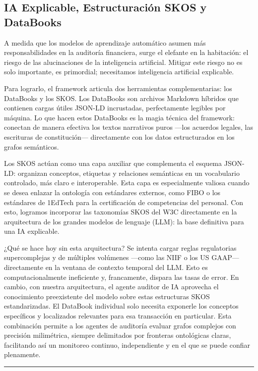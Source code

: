 \documentclass[12pt, a4paper]{article}
\begin{document}
\subsection{IA Explicable, Estructuración SKOS y DataBooks}
A medida que los modelos de aprendizaje automático asumen más responsabilidades en la auditoría financiera, surge el elefante en la habitación: el riesgo de las alucinaciones de la inteligencia artificial. Mitigar este riesgo no es solo importante, es primordial; necesitamos inteligencia artificial explicable.

Para lograrlo, el framework articula dos herramientas complementarias: los DataBooks \cite{cagle2026} y los SKOS. Los DataBooks son archivos Markdown híbridos que contienen cargas útiles JSON-LD incrustadas, perfectamente legibles por máquina. Lo que hacen estos DataBooks es la magia técnica del framework: conectan de manera efectiva los textos narrativos puros ---los acuerdos legales, las escrituras de constitución--- directamente con los datos estructurados en los grafos semánticos.

Los SKOS actúan como una capa auxiliar que complementa el esquema JSON-LD: organizan conceptos, etiquetas y relaciones semánticas en un vocabulario controlado, más claro e interoperable. Esta capa es especialmente valiosa cuando se desea enlazar la ontología con estándares externos, como FIBO o los estándares de 1EdTech para la certificación de competencias del personal. Con esto, logramos incorporar las taxonomías SKOS del W3C \cite{w3cskos} directamente en la arquitectura de los grandes modelos de lenguaje (LLM): la base definitiva para una IA explicable.

¿Qué se hace hoy sin esta arquitectura? Se intenta cargar reglas regulatorias supercomplejas y de múltiples volúmenes ---como las NIIF o los US GAAP--- directamente en la ventana de contexto temporal del LLM. Esto es computacionalmente ineficiente y, francamente, dispara las tasas de error. En cambio, con nuestra arquitectura, el agente auditor de IA aprovecha el conocimiento preexistente del modelo sobre estas estructuras SKOS estandarizadas. El DataBook individual solo necesita exponerle los conceptos específicos y localizados relevantes para esa transacción en particular. Esta combinación permite a los agentes de auditoría evaluar grafos complejos con precisión milimétrica, siempre delimitados por fronteras ontológicas claras, facilitando así un monitoreo continuo, independiente y en el que se puede confiar plenamente.

\hrule
\vspace{1em}
\end{document}
